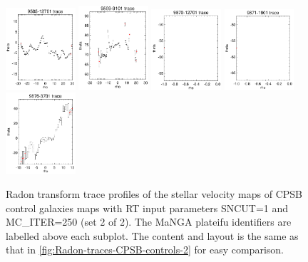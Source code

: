 \documentclass[fleqn,usenatbib]{mnras}
\begin{document}
\begin{figure}
    \includegraphics[width=0.23\textwidth]{Images/SN1-MC250/CPSB-CTRLs/9505-12701-1-250.png}   
    \includegraphics[width=0.23\textwidth]{Images/SN1-MC250/CPSB-CTRLs/9509-9101-1-250.png}
    \includegraphics[width=0.23\textwidth]{Images/SN1-MC250/CPSB-CTRLs/9870-12701-1-250.png}
    \includegraphics[width=0.23\textwidth]{Images/SN1-MC250/CPSB-CTRLs/9871-1901-1-250.png}    
    \includegraphics[width=0.23\textwidth]{Images/SN1-MC250/CPSB-CTRLs/9876-3701-1-250.png}
    \caption{Radon transform trace profiles of the stellar velocity maps of CPSB control galaxies maps with RT input parameters SNCUT=1 and MC\_ITER=250 (set 2 of 2). The MaNGA plateifu identifiers are labelled above each subplot. The content and layout is the same as that in \ref{fig:Radon-traces-CPSB-controls-2} for easy comparison.}
    \label{fig:Radon-traces-CPSB-controls-2-SN1-MC250}
\end{figure}
\end{document}

